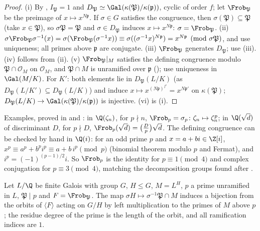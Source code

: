 \begin{proof}
(i) By , $I_{\mathfrak P}=1$ and $D_{\mathfrak P}\simeq\Gal(\kappa(\mathfrak P)/\kappa(\mathfrak p))$, cyclic of order $f$; let
$\Frob_{\mathfrak P}$ be the preimage of $x\mapsto x^{N\mathfrak p}$. If $\sigma\in G$ satisfies the congruence, then $\sigma(\mathfrak P)\subseteq\mathfrak P$
(take $x\in\mathfrak P$), so $\sigma\mathfrak P=\mathfrak P$ and $\sigma\in D_{\mathfrak P}$ induces $x\mapsto x^{N\mathfrak p}$: $\sigma=\Frob_{\mathfrak P}$.
(ii) $\sigma\Frob_{\mathfrak P}\sigma^{-1}(x)=\sigma(\Frob_{\mathfrak P}(\sigma^{-1}x))\equiv\sigma((\sigma^{-1}x)^{N\mathfrak p})=x^{N\mathfrak p}\pmod{\sigma\mathfrak P}$,
and use uniqueness; all primes above $\mathfrak p$ are conjugate. (iii) $\Frob_{\mathfrak P}$ generates $D_{\mathfrak P}$; use
(iii). (iv) follows from (ii). (v) $\Frob_{\mathfrak P}|_M$ satisfies the defining congruence modulo $\mathfrak P\cap\mathcal O_M$ on
$\mathcal O_M$, and $\mathfrak P\cap M$ is unramified over $\mathfrak p$ (); use uniqueness in $\Gal(M/K)$. For $K'$: both elements lie in
$D_{\mathfrak P}(L/K)$ (as $D_{\mathfrak P}(L/K')\subseteq D_{\mathfrak P}(L/K)$) and induce $x\mapsto x^{(N\mathfrak p)^{f'}}=x^{N\mathfrak p'}$ on $\kappa(\mathfrak P)$;
$D_{\mathfrak P}(L/K)\to\Gal(\kappa(\mathfrak P)/\kappa(\mathfrak p))$ is injective. (vi) is (i).
\end{proof}

Examples, proved in  and : in $\Q(\zeta_n)$, for $p\nmid n$, $\Frob_p=\sigma_p\colon\zeta_n\mapsto\zeta_n^p$;
in $\Q(\sqrt d)$ of discriminant $D$, for $p\nmid D$, $\Frob_p(\sqrt d)=\bigl(\frac Dp\bigr)\sqrt d$. The defining congruence can be checked by hand in
$\Q(i)$: for an odd prime $p$ and $x=a+bi\in\Z[i]$, $x^p\equiv a^p+b^pi^p\equiv a+b\,i^p\pmod p$ (binomial theorem modulo $p$ and Fermat), and $i^p=(-1)^{(p-1)/2}i$.
So $\Frob_p$ is the identity for $p\equiv1\pmod4$ and complex conjugation for $p\equiv3\pmod4$, matching the decomposition groups found after
.

\begin{proposition}\label{prop:ant:frobsubfield}
Let $L/\Q$ be finite Galois with group $G$, $H\le G$, $M=L^H$, $p$ a prime unramified in $L$, $\mathfrak P\mid p$ and $F=\Frob_{\mathfrak P}$. The map
$\sigma H\mapsto\sigma^{-1}\mathfrak P\cap M$ induces a bijection from the orbits of $\langle F\rangle$ acting on $G/H$ by left multiplication to the primes
of $M$ above $p$; the residue degree of the prime is the length of the orbit, and all ramification indices are $1$.
\end{proposition}

